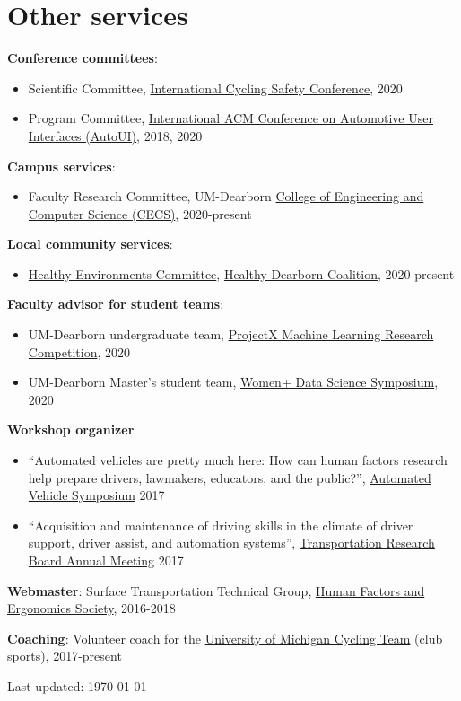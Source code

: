 \documentclass[11pt]{article}
\newenvironment{main}
{\begin{adjustwidth}{3em}{}}
{\end{adjustwidth}}
\begin{document}
\section*{Other services}
\begin{main}

\textbf{Conference committees}: 
\begin{itemize}
    \item Scientific Committee, \href{www.cyclingsafety.net}{International Cycling Safety Conference}, 2020
    \item Program Committee, \href{www.auto-ui.org}{International ACM Conference on Automotive User Interfaces (AutoUI)}, 2018, 2020
\end{itemize}

\textbf{Campus services}: 
\begin{itemize}
    \item Faculty Research Committee, UM-Dearborn \href{https://umdearborn.edu/cecs}{College of Engineering and Computer Science (CECS)}, 2020-present
\end{itemize}

\textbf{Local community services}: 
\begin{itemize}
    \item \href{https://www.healthydearborn.org/healthy-environments}{Healthy Environments Committee}, \href{https://www.healthydearborn.org/}{Healthy Dearborn Coalition}, 2020-present
\end{itemize}


\textbf{Faculty advisor for student teams}: 
\begin{itemize}
    \item UM-Dearborn undergraduate team, \href{https://www.projectx2020.com/}{ProjectX Machine Learning Research Competition}, 2020
    \item UM-Dearborn Master’s student team, \href{https://women-plus-datascience.github.io/home/}{Women+ Data Science Symposium}, 2020
\end{itemize}

\textbf{Workshop organizer}
\begin{itemize}
    \item “Automated vehicles are pretty much here: How can human factors research help prepare drivers, lawmakers, educators, and the public?”, \href{www.automatedvehiclessymposium.org}{Automated Vehicle Symposium} 2017
    \item “Acquisition and maintenance of driving skills in the climate of driver support, driver assist, and automation systems”, \href{http://www.trb.org/AnnualMeeting/}{Transportation Research Board Annual Meeting} 2017
\end{itemize}

\textbf{Webmaster}: Surface Transportation Technical Group, \href{https://www.hfes.org/}{Human Factors and Ergonomics Society}, 2016-2018

\textbf{Coaching}: Volunteer coach for the \href{https://www.umcycling.org/}{University of Michigan Cycling Team} (club sports), 2017-present

\vfill\hfill
Last updated: \today

\end{main}
\end{document}
